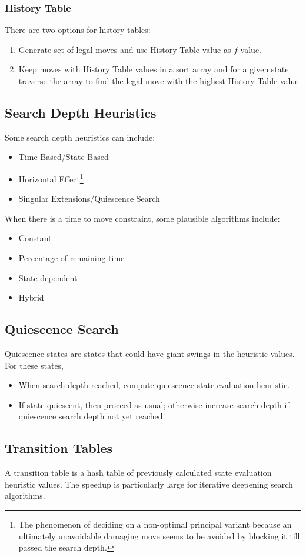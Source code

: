 \subsubsection{History Table}
There are two options for history tables:

\begin{enumerate}
    \item Generate set of legal moves and use History Table value as $f$ value.
    \item Keep moves with History Table values in a sort array and for a given state traverse the array to find the legal move with the highest History Table value.
\end{enumerate}

\subsection{Search Depth Heuristics}
Some search depth heuristics can include:

\begin{itemize}
    \item Time-Based/State-Based
    \item Horizontal Effect\footnote{The phenomenon of deciding on a non-optimal principal variant because an ultimately unavoidable damaging move seems to be avoided by blocking it till passed the search depth.}
    \item Singular Extensions/Quiescence Search
\end{itemize}

When there is a time to move constraint, some plausible algorithms include:

\begin{itemize}
    \item Constant
    \item Percentage of remaining time
    \item State dependent
    \item Hybrid
\end{itemize}

\subsection{Quiescence Search}
Quiescence states are states that could have giant swings in the heuristic values. For these states,

\begin{itemize}
    \item When search depth reached, compute quiescence state evaluation heuristic.
    \item If state quiescent, then proceed as usual; otherwise increase search depth if quiescence search depth not yet reached.
\end{itemize}

\subsection{Transition Tables}
A transition table is a hash table of previously calculated state evaluation heuristic values. The speedup is particularly large for iterative deepening search algorithms.
